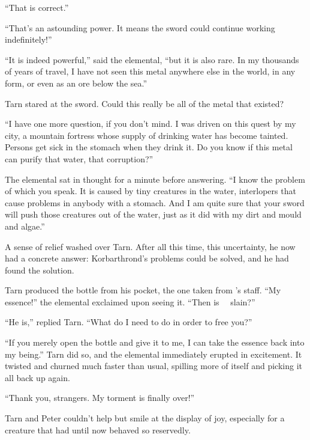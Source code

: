 ``That is correct.''

``That's an astounding power.  It means the sword could continue working indefinitely!''

``It is indeed powerful,'' said the elemental, ``but it is also rare.  In my thousands of years of travel, I have not seen this metal anywhere else in the world, in any form, or even as an ore below the sea.''

Tarn stared at the sword.  Could this really be all of the metal that existed?

``I have one more question, if you don't mind.  I was driven on this quest by my city, a mountain fortress whose supply of drinking water has become tainted.  Persons get sick in the stomach when they drink it.  Do you know if this metal can purify that water, that corruption?''

The elemental sat in thought for a minute before answering.  ``I know the problem of which you speak.  It is caused by tiny creatures in the water, interlopers that cause problems in anybody with a stomach.  And I am quite sure that your sword will push those creatures out of the water, just as it did with my dirt and mould and algae.''

A sense of relief washed over Tarn.  After all this time, this uncertainty, he now had a concrete answer: Korbarthrond's problems could be solved, and he had found the solution.

Tarn produced the bottle from his pocket, the one taken from \mothzam's staff.  ``My essence!'' the elemental exclaimed upon seeing it.  ``Then is \mothzam\ \driktur\ slain?''

``He is,'' replied Tarn.  ``What do I need to do in order to free you?''

``If you merely open the bottle and give it to me, I can take the essence back into my being.''  Tarn did so, and the elemental immediately erupted in excitement.  It twisted and churned much faster than usual, spilling more of itself and picking it all back up again.

``Thank you, strangers.  My torment is finally over!''

Tarn and Peter couldn't help but smile at the display of joy, especially for a creature that had until now behaved so reservedly.






